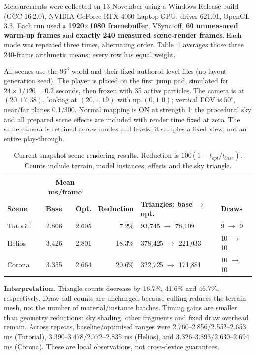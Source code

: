 \documentclass[10pt,a4paper,twocolumn]{article}
\begin{document}
Measurements were collected on 13 November using a Windows Release build (GCC 16.2.0), NVIDIA GeForce RTX 4060 Laptop GPU, driver 621.01, OpenGL 3.3. Each run used a \textbf{1920$\times$1080 framebuffer}, VSync off, \textbf{60 unmeasured warm-up frames} and \textbf{exactly 240 measured scene-render frames}. Each mode was repeated three times, alternating order. Table~\ref{tab:perf} averages those three 240-frame arithmetic means; every row has equal weight.

All scenes use the $96^3$ world and their fixed authored level files (no layout generation seed). The player is placed on the first jump pad, simulated for $24\times1/120=0.2$ seconds, then frozen with 35 active particles. The camera is at $(20,17,38)$, looking at $(20,1,19)$ with up $(0,1,0)$; vertical FOV is $50^\circ$, near/far planes 0.1/300. Normal mapping is ON at strength 1; the procedural sky and all prepared scene effects are included with render time fixed at zero. The same camera is retained across modes and levels; it samples a fixed view, not an entire play-through.

\begin{table}[t]
\centering
\caption{Current-snapshot scene-rendering results. Reduction is $100(1-t_{opt}/t_{base})$. Counts include terrain, model instances, effects and the sky triangle.}\label{tab:perf}
\small
\begin{tabular}{@{}lrrrll@{}}\toprule
&\multicolumn{2}{c}{\textbf{Mean ms/frame}}&&&\\
\textbf{Scene} & \textbf{Base} & \textbf{Opt.} & \textbf{Reduction} & \textbf{Triangles: base $\to$ opt.} & \textbf{Draws}\\\midrule
Tutorial & 2.806 & 2.605 & 7.2\% & 93,745 $\to$ 78,109 & 9 $\to$ 9\\
Helios & 3.426 & 2.801 & 18.3\% & 378,425 $\to$ 221,033 & 10 $\to$ 10\\
Corona & 3.355 & 2.664 & 20.6\% & 322,725 $\to$ 171,881 & 10 $\to$ 10\\\bottomrule
\end{tabular}
\end{table}

\textbf{Interpretation.} Triangle counts decrease by 16.7\%, 41.6\% and 46.7\%, respectively. Draw-call counts are unchanged because culling reduces the terrain mesh, not the number of material/instance batches. Timing gains are smaller than geometry reductions: sky shading, other fragments and fixed draw overhead remain. Across repeats, baseline/optimised ranges were 2.760--2.856/2.552--2.653 ms (Tutorial), 3.390--3.478/2.772--2.835 ms (Helios), and 3.326--3.393/2.630--2.694 ms (Corona). These are local observations, not cross-device guarantees.
\end{document}
